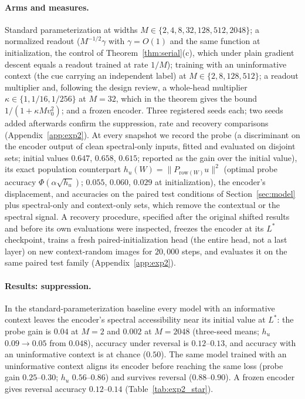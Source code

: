 \paragraph{Arms and measures.}
Standard parameterization at widths $M\in\{2,4,8,32,128,512,2048\}$; a
normalized readout ($M^{-1/2}\gamma$ with $\gamma=O(1)$ and the same
function at initialization, the control of Theorem~\ref{thm:serial}(c),
which under plain gradient descent equals a readout trained at rate $1/M$);
training with an uninformative context (the cue carrying an independent
label) at $M\in\{2,8,128,512\}$;
a readout multiplier and, following the design review, a whole-head
multiplier $\kappa\in\{1,1/16,1/256\}$ at $M=32$, which in the
theorem gives the bound $1/(1+\kappa Mv_0^2)$; and a frozen encoder. Three
registered seeds each; two seeds added afterwards confirm the suppression,
rate and recovery comparisons
(Appendix~\ref{app:exp2}). At every snapshot we record the probe (a discriminant on the
encoder output of clean spectral-only inputs, fitted and evaluated on
disjoint sets; initial values $0.647$, $0.658$, $0.615$; reported as the
gain over the initial value), its exact
population counterpart $h_u(W)=\|P_{\mathrm{row}(W)}u\|^2$ (optimal probe
accuracy $\Phi(\alpha\sqrt{h_u})$; $0.055$, $0.060$, $0.029$ at
initialization), the encoder's displacement, and accuracies on the paired
test conditions of Section~\ref{sec:model} plus spectral-only and
context-only sets, which remove the contextual or the spectral signal. A
recovery procedure, specified after the
original shifted results and before its own evaluations were inspected,
freezes the encoder at its $L^\ast$ checkpoint, trains a fresh
paired-initialization head (the entire head, not a last layer) on new
context-random images for $20{,}000$ steps, and evaluates it on the same
paired test family (Appendix~\ref{app:exp2}).

\paragraph{Results: suppression.}
In the standard-parameterization baseline every model with an informative
context leaves the encoder's spectral accessibility near its initial value
at $L^\ast$: the probe gain is $0.04$ at $M=2$ and $0.002$ at $M=2048$
(three-seed means; $h_u$ $0.09\to0.05$ from $0.048$), accuracy under
reversal is $0.12$--$0.13$, and accuracy
with an uninformative context is at chance ($0.50$). The same model trained
with an uninformative context aligns its encoder before reaching the same
loss (probe gain $0.25$--$0.30$; $h_u$ $0.56$--$0.86$) and survives
reversal ($0.88$--$0.90$). A frozen encoder gives reversal accuracy
$0.12$--$0.14$ (Table~\ref{tab:exp2_star}).

